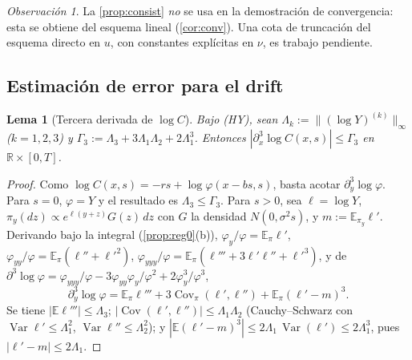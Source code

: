 \documentclass[11pt,letterpaper]{article}
\theoremstyle{plain}
\newtheorem{lema}[theorem]{Lema}
\theoremstyle{definition}
\theoremstyle{remark}
\newtheorem{observacion}[theorem]{Observación}
\numberwithin{equation}{section}
\newcommand{\R}{\mathbb{R}}
\newcommand{\E}{\mathbb{E}}
\newcommand{\norm}[1]{\lVert #1\rVert}
\DeclareMathOperator{\Var}{Var}
\begin{document}
	\begin{observacion}
		La \cref{prop:consist} \emph{no} se usa en la demostración de convergencia: esta se obtiene del esquema lineal (\cref{cor:conv}). Una cota de truncación del esquema directo en \(u\), con constantes explícitas en \(\nu\), es trabajo pendiente.
	\end{observacion}
	
	\subsection{Estimación de error para el drift}\label{subsec:error}
	
	\begin{lema}[Tercera derivada de \(\log C\)]\label{lema:log3}
		Bajo (HY), sean \(\Lambda_k:=\norm{(\log Y)^{(k)}}_\infty\) (\(k=1,2,3\)) y \(\Gamma_3:=\Lambda_3+3\Lambda_1\Lambda_2+2\Lambda_1^3\). Entonces \(|\partial_x^3\log C(x,s)|\le\Gamma_3\) en \(\R\times[0,T]\).
	\end{lema}
	
	\begin{proof}
		Como \(\log C(x,s)=-rs+\log\varphi(x-bs,s)\), basta acotar \(\partial_y^3\log\varphi\). Para \(s=0\), \(\varphi=Y\) y el resultado es \(\Lambda_3\le\Gamma_3\). Para \(s>0\), sea \(\ell=\log Y\), \(\pi_y(dz)\propto e^{\ell(y+z)}G(z)\,dz\) con \(G\) la densidad \(N(0,\sigma^2s)\), y \(m:=\E_{\pi_y}\ell'\). Derivando bajo la integral (\cref{prop:reg0}(b)), \(\varphi_y/\varphi=\E_\pi\ell'\), \(\varphi_{yy}/\varphi=\E_\pi(\ell''+\ell'^2)\), \(\varphi_{yyy}/\varphi=\E_\pi(\ell'''+3\ell'\ell''+\ell'^3)\), y de \(\partial^3\log\varphi=\varphi_{yyy}/\varphi-3\varphi_{yy}\varphi_y/\varphi^2+2\varphi_y^3/\varphi^3\),
		\[
		\partial_y^3\log\varphi=\E_\pi\ell'''+3\operatorname{Cov}_\pi(\ell',\ell'')+\E_\pi(\ell'-m)^3.
		\]
		Se tiene \(|\E\ell'''|\le\Lambda_3\); \(|\operatorname{Cov}(\ell',\ell'')|\le\Lambda_1\Lambda_2\) (Cauchy--Schwarz con \(\Var\ell'\le\Lambda_1^2\), \(\Var\ell''\le\Lambda_2^2\)); y \(|\E(\ell'-m)^3|\le2\Lambda_1\,\Var(\ell')\le2\Lambda_1^3\), pues \(|\ell'-m|\le2\Lambda_1\).
	\end{proof}
	
\end{document}
